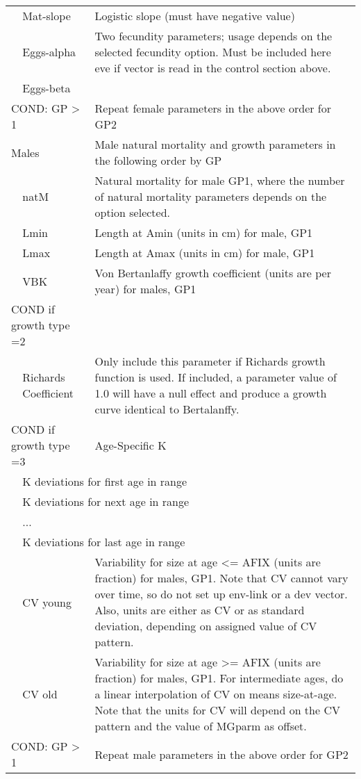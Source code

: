 \begin{center}
\begin{longtable}{p{1cm} p{2.5cm} p{10cm}}
		& Mat-slope & Logistic slope (must have negative value) \\
		& Eggs-alpha & Two fecundity parameters; usage depends on the selected fecundity option.  Must be included here eve if vector is read in the control section above.\\
		& Eggs-beta & \\
		\hline
		\multicolumn{2}{l}{COND: GP > 1} & Repeat female parameters in the above order for GP2\\
		\hline
		\multicolumn{2}{l}{Males} & Male natural mortality and growth parameters in the following order by GP\\
		& natM & Natural mortality for male GP1, where the number of natural mortality parameters depends on the option selected.\\
		& Lmin & Length at Amin (units in cm) for male, GP1\\
		& Lmax & Length at Amax (units in cm) for male, GP1\ \\
		& VBK &  Von Bertanlaffy growth coefficient (units are per year) for males, GP1\\
		\hline
		\multicolumn{2}{l}{COND if growth type =2 } & \\
		& Richards Coefficient & Only include this parameter if Richards growth function is used.  If included, a parameter value of 1.0 will have a null effect and produce a growth curve identical to Bertalanffy.\\
		\multicolumn{2}{l}{COND if growth type =3 } & Age-Specific K \\
		& \multicolumn{2}{l}{K deviations for first age in range}\\
		& \multicolumn{2}{l}{K deviations for next age in range}\\
		& ... & \\
		& \multicolumn{2}{l}{K deviations for last age in range}\\
		\hline
		& CV young & Variability for size at age <= AFIX (units are fraction) for males, GP1.  Note that CV cannot vary over time, so do not set up env-link or a dev vector.  Also, units are either as CV or as standard deviation, depending on assigned value of CV pattern.\\
		& CV old &  Variability for size at age >= AFIX (units are fraction) for males, GP1. For intermediate ages, do a linear interpolation of CV on means size-at-age.  Note that the units for CV will depend on the CV pattern and the value of MGparm as offset.\\
		\multicolumn{2}{l}{COND: GP > 1} & Repeat male parameters in the above order for GP2\\

\end{longtable}
\end{center}
